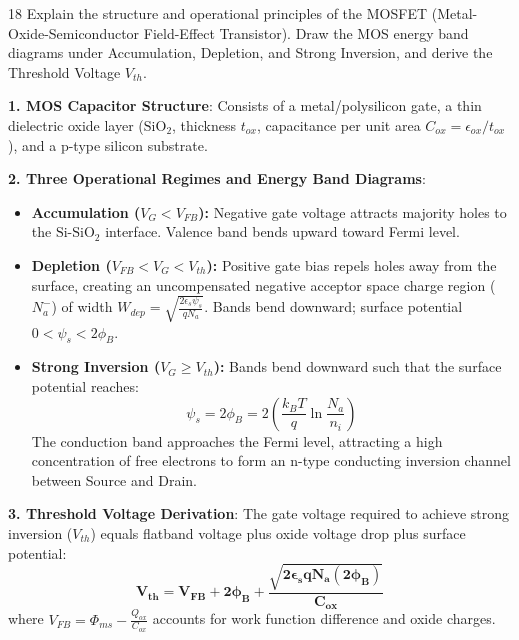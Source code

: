 \begin{theoryq}{18}
Explain the structure and operational principles of the MOSFET (Metal-Oxide-Semiconductor Field-Effect Transistor). Draw the MOS energy band diagrams under Accumulation, Depletion, and Strong Inversion, and derive the Threshold Voltage $V_{th}$.
\end{theoryq}
\begin{theorysol}
\textbf{1. MOS Capacitor Structure}:
Consists of a metal/polysilicon gate, a thin dielectric oxide layer ($\text{SiO}_2$, thickness $t_{ox}$, capacitance per unit area $C_{ox} = \epsilon_{ox}/t_{ox}$), and a p-type silicon substrate.

\textbf{2. Three Operational Regimes and Energy Band Diagrams}:
\begin{itemize}
\item \textbf{Accumulation ($V_G < V_{FB}$):} Negative gate voltage attracts majority holes to the $\text{Si-SiO}_2$ interface. Valence band bends upward toward Fermi level.
\item \textbf{Depletion ($V_{FB} < V_G < V_{th}$):} Positive gate bias repels holes away from the surface, creating an uncompensated negative acceptor space charge region ($N_a^-$) of width $W_{dep} = \sqrt{\frac{2\epsilon_s \psi_s}{q N_a}}$. Bands bend downward; surface potential $0 < \psi_s < 2\phi_B$.
\item \textbf{Strong Inversion ($V_G \ge V_{th}$):} Bands bend downward such that the surface potential reaches:
\begin{equation}
\psi_s = 2\phi_B = 2\left(\frac{k_B T}{q}\ln\frac{N_a}{n_i}\right)
\end{equation}
The conduction band approaches the Fermi level, attracting a high concentration of free electrons to form an n-type conducting inversion channel between Source and Drain.
\end{itemize}

\textbf{3. Threshold Voltage Derivation}:
The gate voltage required to achieve strong inversion ($V_{th}$) equals flatband voltage plus oxide voltage drop plus surface potential:
\begin{equation}
\mathbf{V_{th} = V_{FB} + 2\phi_B + \frac{\sqrt{2\epsilon_s q N_a (2\phi_B)}}{C_{ox}}}
\end{equation}
where $V_{FB} = \Phi_{ms} - \frac{Q_{ox}}{C_{ox}}$ accounts for work function difference and oxide charges.
\end{theorysol}
\vspace{4mm}

